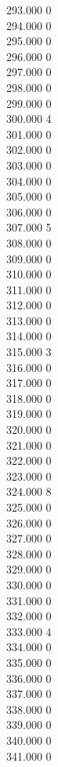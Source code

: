 { 293.000	0 \\
 294.000	0 \\
 295.000	0 \\
 296.000	0 \\
 297.000	0 \\
 298.000	0 \\
 299.000	0 \\
 300.000	4 \\
 301.000	0 \\
 302.000	0 \\
 303.000	0 \\
 304.000	0 \\
 305.000	0 \\
 306.000	0 \\
 307.000	5 \\
 308.000	0 \\
 309.000	0 \\
 310.000	0 \\
 311.000	0 \\
 312.000	0 \\
 313.000	0 \\
 314.000	0 \\
 315.000	3 \\
 316.000	0 \\
 317.000	0 \\
 318.000	0 \\
 319.000	0 \\
 320.000	0 \\
 321.000	0 \\
 322.000	0 \\
 323.000	0 \\
 324.000	8 \\
 325.000	0 \\
 326.000	0 \\
 327.000	0 \\
 328.000	0 \\
 329.000	0 \\
 330.000	0 \\
 331.000	0 \\
 332.000	0 \\
 333.000	4 \\
 334.000	0 \\
 335.000	0 \\
 336.000	0 \\
 337.000	0 \\
 338.000	0 \\
 339.000	0 \\
 340.000	0 \\
 341.000	0 \\
}
